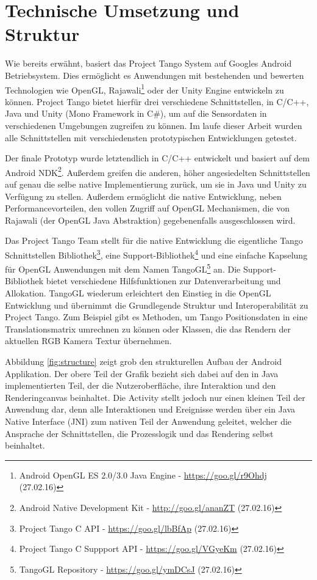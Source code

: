 \section{Technische Umsetzung und Struktur} \label{eq:technic}

Wie bereits erwähnt, basiert das Project Tango System auf Googles Android Betriebsystem. Dies ermöglicht es Anwendungen mit bestehenden und bewerten Technologien wie OpenGL, Rajawali\footnote{Android OpenGL ES 2.0/3.0 Java Engine - \url{https://goo.gl/r9Ohdj} (27.02.16)} oder der Unity Engine entwickeln zu können. Project Tango bietet hierfür drei verschiedene Schnittstellen, in C/C++, Java und Unity (Mono Framework in C\#), um auf die Sensordaten in verschiedenen Umgebungen zugreifen zu können. Im laufe dieser Arbeit wurden alle Schnittstellen mit verschiedensten prototypischen Entwicklungen getestet.

Der finale Prototyp wurde letztendlich in C/C++ entwickelt und basiert auf dem Android NDK\footnote{Android Native Development Kit - \url{http://goo.gl/ananZT} (27.02.16)}. Außerdem greifen die anderen, höher angesiedelten Schnittstellen auf genau die selbe native Implementierung zurück, um sie in Java und Unity zu Verfügung zu stellen. Außerdem ermöglicht die native Entwicklung, neben Performancevorteilen, den vollen Zugriff auf OpenGL Mechanismen, die von Rajawali (der OpenGL Java Abstraktion) gegebenenfalls ausgeschlossen wird. 

Das Project Tango Team stellt für die native Entwicklung die eigentliche Tango Schnittstellen Bibliothek\footnote{Project Tango C API - \url{https://goo.gl/lbBfAp} (27.02.16)}, eine Support-Bibliothek\footnote{Project Tango C Suppport API - \url{https://goo.gl/VGyeKm} (27.02.16)} und eine einfache Kapselung für OpenGL Anwendungen mit dem Namen TangoGL\footnote{TangoGL Repository - \url{https://goo.gl/ymDCsJ} (27.02.16)} an. Die Support-Bibliothek bietet verschiedene Hilfsfunktionen zur Datenverarbeitung und Allokation. TangoGL wiederum erleichtert den Einstieg in die OpenGL Entwicklung und übernimmt die Grundlegende Struktur und Interoperabilität zu Project Tango. Zum Beispiel gibt es Methoden, um Tango Positionsdaten in eine Translationsmatrix umrechnen zu können oder Klassen, die das Rendern der aktuellen RGB Kamera Textur übernehmen. 

Abbildung \ref{fig:structure} zeigt grob den strukturellen Aufbau der Android Applikation. Der obere Teil der Grafik bezieht sich dabei auf den in Java implementierten Teil, der die Nutzeroberfläche, ihre Interaktion und den Renderingcanvas beinhaltet. Die Activity stellt jedoch nur einen kleinen Teil der Anwendung dar, denn alle Interaktionen und Ereignisse werden über ein Java Native Interface (JNI) zum nativen Teil der Anwendung geleitet, welcher die Ansprache der Schnittstellen, die Prozesslogik und das Rendering selbst beinhaltet. 

